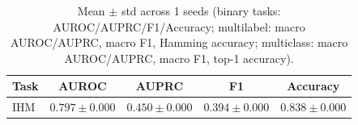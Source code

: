 \begin{table}[h]
\centering
\begin{tabular}{l|cccc}
\hline
Task & AUROC & AUPRC & F1 & Accuracy \\
\hline
IHM & $0.797 \pm 0.000$ & $0.450 \pm 0.000$ & $0.394 \pm 0.000$ & $0.838 \pm 0.000$ \\
\hline
\end{tabular}
\caption{Mean $\pm$ std across 1 seeds (binary tasks: AUROC/AUPRC/F1/Accuracy; multilabel: macro AUROC/AUPRC, macro F1, Hamming accuracy; multiclass: macro AUROC/AUPRC, macro F1, top-1 accuracy).}
\end{table}
